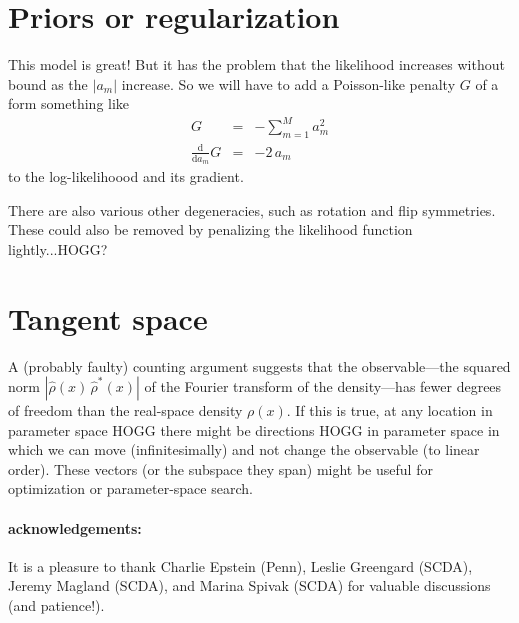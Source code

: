 \documentclass[12pt]{article}
\newcommand{\dd}{\mathrm{d}}
\begin{document}
\section{Priors or regularization}

This model is great! But it has the problem that the likelihood
increases without bound as the $|a_m|$ increase.
So we will have to add a Poisson-like penalty $G$ of a form
something like
\begin{eqnarray}
  G &=& -\sum_{m=1}^M a_m^2
  \\
  \frac{\dd}{\dd a_m} G &=& -2\,a_m
\end{eqnarray}
to the log-likelihoood and its gradient.

There are also various other degeneracies, such as rotation and
flip symmetries.
These could also be removed by penalizing the likelihood function
lightly...HOGG?

\section{Tangent space}

A (probably faulty) counting argument suggests that the
observable---the squared norm $|\hat{\rho}(x)\,\hat{\rho}^{\ast}(x)|$
of the Fourier transform of the density---has fewer degrees of freedom
than the real-space density $\rho(x)$.
If this is true, at any location in parameter space HOGG there might
be directions HOGG in parameter space in which we can move
(infinitesimally) and not change the observable (to linear order).
These vectors (or the subspace they span) might be useful for
optimization or parameter-space search.

\paragraph{acknowledgements:}
It is a pleasure to thank
  Charlie Epstein (Penn),
  Leslie Greengard (SCDA),
  Jeremy Magland (SCDA),
  and
  Marina Spivak (SCDA)
for valuable discussions (and patience!).
\end{document}

